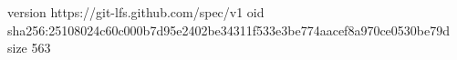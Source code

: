 version https://git-lfs.github.com/spec/v1
oid sha256:25108024c60c000b7d95e2402be34311f533e3be774aacef8a970ce0530be79d
size 563
